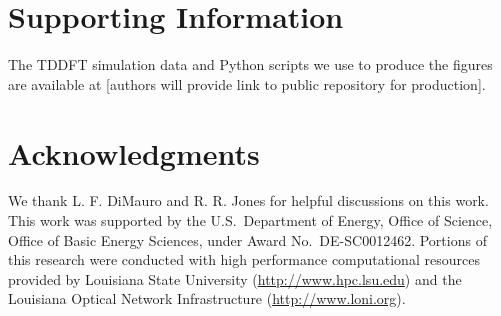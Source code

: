 \documentclass[journal=jacsat,manuscript=article]{achemso}
\begin{document}
\section{Supporting Information}

The TDDFT simulation data and Python scripts we use to produce the figures are available at [authors will provide link to public repository for production].

\section{Acknowledgments}

We thank L. F. DiMauro and R. R. Jones for helpful discussions on this work.
%
This work was supported by the U.S.\ Department of Energy, Office of Science, Office of Basic Energy Sciences, under Award No.~DE-SC0012462.
%
Portions of this research were conducted with high performance computational resources provided by Louisiana State University (\url{http://www.hpc.lsu.edu}) and the Louisiana Optical Network Infrastructure (\url{http://www.loni.org}).
\end{document}
